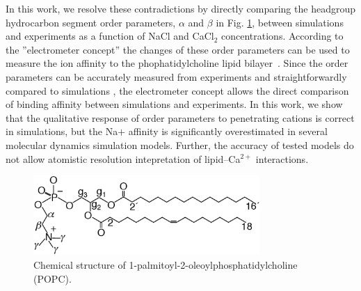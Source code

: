 \documentclass[pre,aps,floatfix,authordate1-4,twocolumn]{revtex4-1}
\begin{document}
In this work, we resolve these contradictions by directly comparing the headgroup hydrocarbon 
segment order parameters, $\alpha$ and $\beta$ in Fig. \ref{POPCstructure}, 
between simulations and experiments as a function of NaCl and CaCl$_2$ concentrations. 
According to the ''electrometer concept'' the changes of these order parameters can be 
used to measure the ion affinity to the phophatidylcholine lipid bilayer~\cite{akutsu81,altenbach84,seelig87,scherer89}.
Since the order parameters can be accurately measured from experiments and straightforwardly compared to 
simulations \cite{ollila15}, the electrometer concept allows the direct comparison of binding affinity between simulations
and experiments. In this work, we show that the qualitative response of order parameters
to penetrating cations is correct in simulations, but the Na$ {+}$ affinity is significantly
overestimated in several molecular dynamics simulation models. Further, the 
accuracy of tested models do not allow atomistic resolution intepretation of 
lipid--Ca$^{2+}$ interactions.

\begin{figure}[]
  \centering
  \includegraphics[width=8.6cm]{../Fig/POPCstructure.eps}

  \caption{\label{POPCstructure}
    Chemical structure of 1-palmitoyl-2-oleoylphosphatidylcholine (POPC).}
  
\end{figure}
\end{document}
